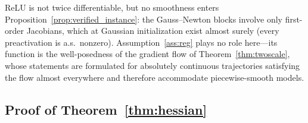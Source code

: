 \begin{remark}
\label{rem:relu_scope}
ReLU is not twice differentiable, but no smoothness enters
Proposition~\ref{prop:verified_instance}: the Gauss--Newton blocks involve
only first-order Jacobians, which at Gaussian initialization exist almost
surely (every preactivation is a.s.\ nonzero). Assumption~\ref{ass:reg}
plays no role here---its function is the well-posedness of the gradient flow
of Theorem~\ref{thm:twoscale}, whose statements are formulated for
absolutely continuous trajectories satisfying the flow almost everywhere and
therefore accommodate piecewise-smooth models.
\end{remark}

\subsection{Proof of Theorem~\ref{thm:hessian}}
\label{app:thm1}

